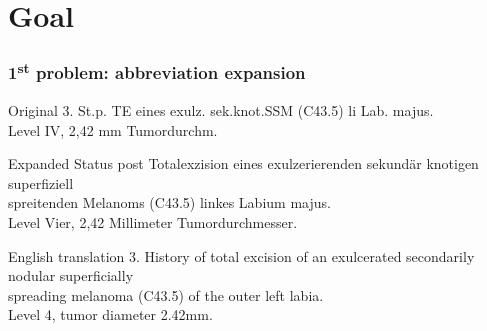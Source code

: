 \section{Goal}


\begin{frame}
	\frametitle{1\textsuperscript{st} problem: abbreviation expansion}
	\begin{exampleblock}{Original}
	3. St.p. TE eines exulz. sek.knot.SSM (C43.5) li Lab. majus.\\
	Level IV, 2,42 mm Tumordurchm.
	\end{exampleblock}
	
	\pause
	
	\begin{exampleblock}{Expanded}
	Status post Totalexzision eines exulzerierenden sekundär knotigen superfiziell\\
	spreitenden Melanoms (C43.5) linkes Labium majus.\\
	Level Vier, 2,42 Millimeter Tumordurchmesser.
	\end{exampleblock}
	
	\pause
	
	\begin{exampleblock}{English translation}
	3. History of total excision of an exulcerated secondarily nodular superficially\\
	spreading melanoma (C43.5) of the outer left labia.\\
	Level 4, tumor diameter 2.42mm.
	\end{exampleblock}
\end{frame}

